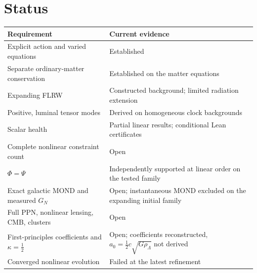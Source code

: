 \documentclass[11pt,letterpaper]{article}
\begin{document}
\section{Status}
\begin{center}
\begin{tabular}{L{7.2cm}L{8.3cm}}\toprule
Requirement & Current evidence\\\midrule
Explicit action and varied equations & Established\\
Separate ordinary-matter conservation & Established on the matter equations\\
Expanding FLRW & Constructed background; limited radiation extension\\
Positive, luminal tensor modes & Derived on homogeneous clock backgrounds\\
Scalar health & Partial linear results; conditional Lean certificates\\
Complete nonlinear constraint count & Open\\
$\Phi=\Psi$ & Independently supported at linear order on the tested family\\
Exact galactic MOND and measured $G_N$ & Open; instantaneous MOND excluded on the expanding initial family\\
Full PPN, nonlinear lensing, CMB, clusters & Open\\
First-principles coefficients and $\kappa=\tfrac12$ & Open; coefficients reconstructed, $a_0=\tfrac12c\sqrt{G\rho_\Lambda}$ not derived\\
Converged nonlinear evolution & Failed at the latest refinement\\\bottomrule
\end{tabular}
\end{center}
\end{document}
